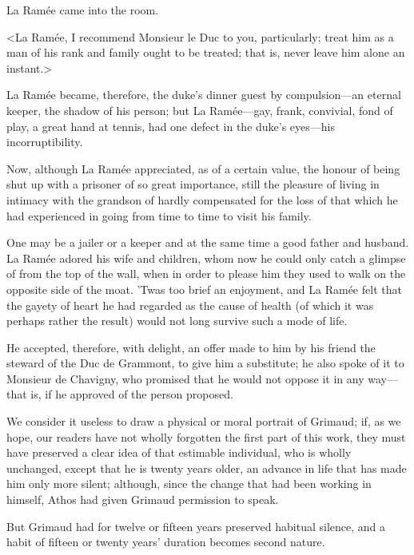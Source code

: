 La Ramée came into the room.

<La Ramée, I recommend Monsieur le Duc to you, particularly; treat him as a man of his rank and family ought to be treated; that is, never leave him alone an instant.>

La Ramée became, therefore, the duke's dinner guest by compulsion—an eternal keeper, the shadow of his person; but La Ramée—gay, frank, convivial, fond of play, a great hand at tennis, had one defect in the duke's eyes—his incorruptibility.

Now, although La Ramée appreciated, as of a certain value, the honour of being shut up with a prisoner of so great importance, still the pleasure of living in intimacy with the grandson of  hardly compensated for the loss of that which he had experienced in going from time to time to visit his family.

One may be a jailer or a keeper and at the same time a good father and husband. La Ramée adored his wife and children, whom now he could only catch a glimpse of from the top of the wall, when in order to please him they used to walk on the opposite side of the moat. 'Twas too brief an enjoyment, and La Ramée felt that the gayety of heart he had regarded as the cause of health (of which it was perhaps rather the result) would not long survive such a mode of life.

He accepted, therefore, with delight, an offer made to him by his friend the steward of the Duc de Grammont, to give him a substitute; he also spoke of it to Monsieur de Chavigny, who promised that he would not oppose it in any way—that is, if he approved of the person proposed.

We consider it useless to draw a physical or moral portrait of Grimaud; if, as we hope, our readers have not wholly forgotten the first part of this work, they must have preserved a clear idea of that estimable individual, who is wholly unchanged, except that he is twenty years older, an advance in life that has made him only more silent; although, since the change that had been working in himself, Athos had given Grimaud permission to speak.

But Grimaud had for twelve or fifteen years preserved habitual silence, and a habit of fifteen or twenty years' duration becomes second nature. 